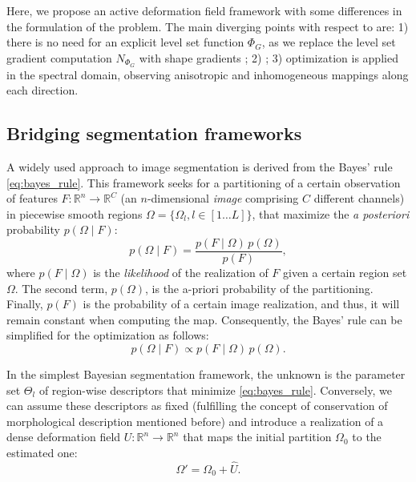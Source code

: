 Here, we propose an active deformation field framework with some differences in
the formulation of the problem. The main diverging points with respect to
\citep{gorthi_active_2011} are: 1) there is no need for an explicit level set function
$\Phi_G$, as we replace the level set gradient computation $N_{\Phi_G}$ with shape
gradients \citep{jehan-besson_dream2s:_2003,herbulot_segmentation_2006}; 2) 
; 3) optimization is applied in the spectral
domain, observing anisotropic and inhomogeneous mappings along each direction.


\subsection{Bridging segmentation frameworks}
\label{sec:methods_map}
%
A widely used approach to image segmentation is derived from the
Bayes' rule \eqref{eq:bayes_rule}. This framework seeks for a 
partitioning of a certain observation of features $F: \mathbb{R}^n \to %
\mathbb{R}^C$ (an $n$-dimensional \emph{image} comprising $C$ different 
channels) in piecewise smooth regions $\Omega = \lbrace \Omega_l , 
l\in\left[ 1 \ldots L \right] \rbrace$,  that maximize the \emph{a posteriori}
probability $p(\Omega \mid F)$:
\begin{equation}
p(\Omega \mid F) = \frac{p(F \mid \Omega)\, p(\Omega)}{p(F)},
\label{eq:bayes_rule}
\end{equation}
where $p(F \mid \Omega)$ is the \emph{likelihood} of the realization 
of $F$ given a certain region set $\Omega$. The second term, $p(\Omega)$,
is the a-priori probability of the partitioning. Finally, $p(F)$ is the 
probability of a certain image realization, and thus, it will remain 
constant when computing the \gls{map}. Consequently, the Bayes' rule
can be simplified for the optimization as follows:
\begin{equation}
p(\Omega \mid F) \propto p(F \mid \Omega)\, p(\Omega).
\label{eq:bayes_rule_simplified}
\end{equation}

In the simplest Bayesian segmentation framework, the unknown is the
parameter set $\Theta_l$ of region-wise descriptors that minimize 
\eqref{eq:bayes_rule}. Conversely, we can assume these descriptors as
fixed (fulfilling the concept of conservation of morphological description
mentioned before) and introduce a realization of a dense deformation field $U: %
\mathbb{R}^n \to \mathbb{R}^n$ that maps the initial partition $\Omega_0$
to the estimated one:
\begin{equation}
\Omega' = \Omega_0 + \hat{U}.
\label{eq:omega_tf}
\end{equation}


